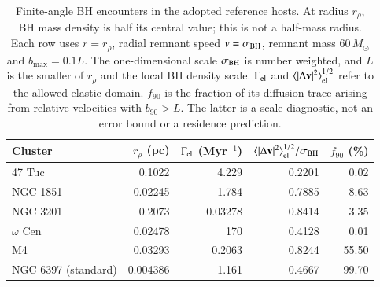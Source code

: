 \begin{table}[t]
\caption{Finite-angle BH encounters in the adopted reference hosts. At radius $r_\rho$, BH mass density is half its central value; this is not a half-mass radius. Each row uses $r=r_\rho$, radial remnant speed $v=\sigma_{\rm BH}$, remnant mass $60\,M_\odot$ and $b_{\max}=0.1L$. The one-dimensional scale $\sigma_{\rm BH}$ is number weighted, and $L$ is the smaller of $r_\rho$ and the local BH density scale. $\Gamma_{\rm el}$ and $\langle|\Delta\mathbf v|^2\rangle_{\rm el}^{1/2}$ refer to the allowed elastic domain. $f_{90}$ is the fraction of its diffusion trace arising from relative velocities with $b_{90}>L$. The latter is a scale diagnostic, not an error bound or a residence prediction.}\label{tab:finite-angle-encounters}
\centering\begin{tabular}{lrrrr}
\toprule
Cluster & $r_\rho$ (pc) & $\Gamma_{\rm el}$ (Myr$^{-1}$) & $\langle|\Delta\mathbf v|^2\rangle_{\rm el}^{1/2}/\sigma_{\rm BH}$ & $f_{90}$ (\%) \\
\midrule
47 Tuc & 0.1022 & 4.229 & 0.2201 & 0.02 \\
NGC 1851 & 0.02245 & 1.784 & 0.7885 & 8.63 \\
NGC 3201 & 0.2073 & 0.03278 & 0.8414 & 3.35 \\
$\omega$ Cen & 0.02478 & 170 & 0.4128 & 0.01 \\
M4 & 0.03293 & 0.2063 & 0.8244 & 55.50 \\
NGC 6397 (standard) & 0.004386 & 1.161 & 0.4667 & 99.70 \\
\bottomrule
\end{tabular}
\end{table}
